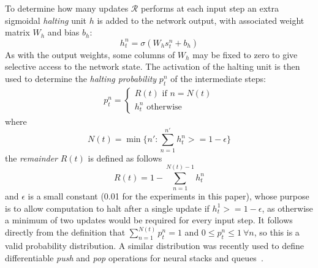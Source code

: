 \documentclass[10pt]{article}
\newcommand{\rnn}{\mathcal{R}}
\newcommand{\elabel}[1]{\label{eq:#1}}
\begin{document}
To determine how many updates $\rnn$ performs at each input step an extra sigmoidal \emph{halting} unit $h$ is added to the network output, with associated weight matrix $W_h$ and bias $b_h$:
\begin{equation}\elabel{halting_act}
h^n_t = \sigma\left(W_h s^n_t + b_h\right)
\end{equation}
As with the output weights, some columns of $W_h$ may be fixed to zero to give selective access to the network state.
The activation of the halting unit is then used to determine the \emph{halting probability} $p^n_t$ of the intermediate steps:
\begin{align}\elabel{halting_prob}
p^n_t = \begin{cases}R(t)\text{ if }n=N(t)\\h^n_t\text{ otherwise}\end{cases}
\end{align}
where
\begin{equation}\elabel{epsilon}
N(t) =\min\{n':\sum_{n=1}^{n'} h^n_t >= 1-\epsilon\}
\end{equation}
the \emph{remainder} $R(t)$ is defined as follows
\begin{equation}\elabel{remainder}
R(t) = 1 - \sum_{n=1}^{N(t)-1} h^n_t
\end{equation}
and $\epsilon$ is a small constant (0.01 for the experiments in this paper), whose purpose is to allow computation to halt after a single update if $h^1_t >= 1-\epsilon$, as otherwise a minimum of two updates would be required for every input step.
It follows directly from the definition that $\sum_{n=1}^{N(t)}p^n_t = 1$ and $0 \leq p^n_t\leq 1\ \forall n$, so this is a valid probability distribution.
A similar distribution was recently used to define differentiable \emph{push} and \emph{pop} operations for neural stacks and queues~\cite{grefenstette2015learning}.
\end{document}
